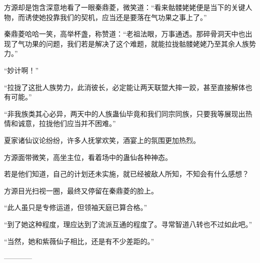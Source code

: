 \begin{this_body}
方源却是饱含深意地看了一眼秦鼎菱，微笑道：“看来骷髅姥姥便是当下的关键人物，而诱使她投靠我们的契机，应当还是要落在气功果之事上了。”

秦鼎菱哈哈一笑，高举杯盏，称赞道：“老祖法眼，万事通透。那碎骨洞天中也出现了气功果的问题，我们若是解决了这个难题，就能拉拢骷髅姥姥乃至其余人族势力。”

“妙计啊！”

“拉拢了这批人族势力，此消彼长，必定能让两天联盟大摔一跤，甚至直接解体也有可能。”

“非我族类其心必异，两天中的人族蛊仙毕竟和我们同宗同族，只要我等展现出热情和诚意，拉拢他们应当并不困难。”

夏家诸仙议论纷纷，许多人抚掌欢笑，酒宴上的氛围更加热烈。

方源面带微笑，高坐主位，看着场中的蛊仙各种神态。

若是他们知道，自己的计划还未实施，就已经被敌人所知，不知会有什么感想？

方源目光扫视一圈，最终又停留在秦鼎菱的脸上。

“此人虽只是专修运道，但领袖天庭已算合格。”

“到了她这种程度，理应达到了流派互通的程度了。寻常智道八转也不过如此吧。”

“当然，她和紫薇仙子相比，还是有不少差距的。”

------------

\end{this_body}

